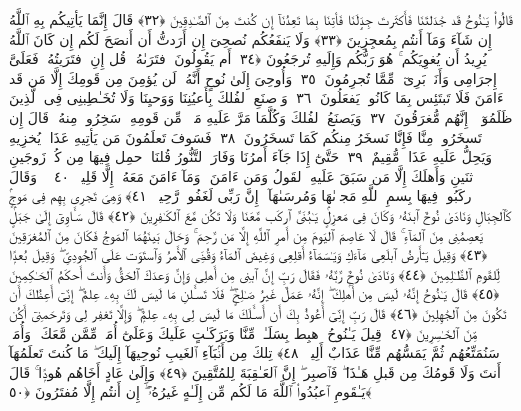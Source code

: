  قَالُوا۟ يَـٰنُوحُ قَد جَٰدَلتَنَا فَأَكثَرتَ جِدَٟلَنَا فَأتِنَا بِمَا تَعِدُنَآ إِن كُنتَ مِنَ ٱلصَّـٰدِقِينَ ﴿٣٢﴾
 قَالَ إِنَّمَا يَأتِيكُم بِهِ ٱللَّهُ إِن شَآءَ وَمَآ أَنتُم بِمُعجِزِينَ ﴿٣٣﴾
 وَلَا يَنفَعُكُم نُصحِىٓ إِن أَرَدتُّ أَن أَنصَحَ لَكُم إِن كَانَ ٱللَّهُ يُرِيدُ أَن يُغوِيَكُم ۚ هُوَ رَبُّكُم وَإِلَيهِ تُرجَعُونَ ﴿٣٤﴾
 أَم يَقُولُونَ ٱفتَرَىٰهُ ۖ قُل إِنِ ٱفتَرَيتُهُۥ فَعَلَىَّ إِجرَامِى وَأَنَا۠ بَرِىٓءٌۭ مِّمَّا تُجرِمُونَ ﴿٣٥﴾
 وَأُوحِىَ إِلَىٰ نُوحٍ أَنَّهُۥ لَن يُؤمِنَ مِن قَومِكَ إِلَّا مَن قَد ءَامَنَ فَلَا تَبتَئِس بِمَا كَانُوا۟ يَفعَلُونَ ﴿٣٦﴾
 وَٱصنَعِ ٱلفُلكَ بِأَعيُنِنَا وَوَحيِنَا وَلَا تُخَـٰطِبنِى فِى ٱلَّذِينَ ظَلَمُوٓا۟ ۚ إِنَّهُم مُّغرَقُونَ ﴿٣٧﴾
 وَيَصنَعُ ٱلفُلكَ وَكُلَّمَا مَرَّ عَلَيهِ مَلَأٌۭ مِّن قَومِهِۦ سَخِرُوا۟ مِنهُ ۚ قَالَ إِن تَسخَرُوا۟ مِنَّا فَإِنَّا نَسخَرُ مِنكُم كَمَا تَسخَرُونَ ﴿٣٨﴾
 فَسَوفَ تَعلَمُونَ مَن يَأتِيهِ عَذَابٌۭ يُخزِيهِ وَيَحِلُّ عَلَيهِ عَذَابٌۭ مُّقِيمٌ ﴿٣٩﴾
 حَتَّىٰٓ إِذَا جَآءَ أَمرُنَا وَفَارَ ٱلتَّنُّورُ قُلنَا ٱحمِل فِيهَا مِن كُلٍّۢ زَوجَينِ ٱثنَينِ وَأَهلَكَ إِلَّا مَن سَبَقَ عَلَيهِ ٱلقَولُ وَمَن ءَامَنَ ۚ وَمَآ ءَامَنَ مَعَهُۥٓ إِلَّا قَلِيلٌۭ ﴿٤٠﴾
 ۞ وَقَالَ ٱركَبُوا۟ فِيهَا بِسمِ ٱللَّهِ مَجر۪ىٰهَا وَمُرسَىٰهَآ ۚ إِنَّ رَبِّى لَغَفُورٌۭ رَّحِيمٌۭ ﴿٤١﴾
 وَهِىَ تَجرِى بِهِم فِى مَوجٍۢ كَٱلجِبَالِ وَنَادَىٰ نُوحٌ ٱبنَهُۥ وَكَانَ فِى مَعزِلٍۢ يَـٰبُنَىَّ ٱركَب مَّعَنَا وَلَا تَكُن مَّعَ ٱلكَـٰفِرِينَ ﴿٤٢﴾
 قَالَ سَـَٔاوِىٓ إِلَىٰ جَبَلٍۢ يَعصِمُنِى مِنَ ٱلمَآءِ ۚ قَالَ لَا عَاصِمَ ٱليَومَ مِن أَمرِ ٱللَّهِ إِلَّا مَن رَّحِمَ ۚ وَحَالَ بَينَهُمَا ٱلمَوجُ فَكَانَ مِنَ ٱلمُغرَقِينَ ﴿٤٣﴾
 وَقِيلَ يَـٰٓأَرضُ ٱبلَعِى مَآءَكِ وَيَـٰسَمَآءُ أَقلِعِى وَغِيضَ ٱلمَآءُ وَقُضِىَ ٱلأَمرُ وَٱستَوَت عَلَى ٱلجُودِىِّ ۖ وَقِيلَ بُعدًۭا لِّلقَومِ ٱلظَّـٰلِمِينَ ﴿٤٤﴾
 وَنَادَىٰ نُوحٌۭ رَّبَّهُۥ فَقَالَ رَبِّ إِنَّ ٱبنِى مِن أَهلِى وَإِنَّ وَعدَكَ ٱلحَقُّ وَأَنتَ أَحكَمُ ٱلحَـٰكِمِينَ ﴿٤٥﴾
 قَالَ يَـٰنُوحُ إِنَّهُۥ لَيسَ مِن أَهلِكَ ۖ إِنَّهُۥ عَمَلٌ غَيرُ صَـٰلِحٍۢ ۖ فَلَا تَسـَٔلنِ مَا لَيسَ لَكَ بِهِۦ عِلمٌ ۖ إِنِّىٓ أَعِظُكَ أَن تَكُونَ مِنَ ٱلجَٰهِلِينَ ﴿٤٦﴾
 قَالَ رَبِّ إِنِّىٓ أَعُوذُ بِكَ أَن أَسـَٔلَكَ مَا لَيسَ لِى بِهِۦ عِلمٌۭ ۖ وَإِلَّا تَغفِر لِى وَتَرحَمنِىٓ أَكُن مِّنَ ٱلخَـٰسِرِينَ ﴿٤٧﴾
 قِيلَ يَـٰنُوحُ ٱهبِط بِسَلَـٰمٍۢ مِّنَّا وَبَرَكَـٰتٍ عَلَيكَ وَعَلَىٰٓ أُمَمٍۢ مِّمَّن مَّعَكَ ۚ وَأُمَمٌۭ سَنُمَتِّعُهُم ثُمَّ يَمَسُّهُم مِّنَّا عَذَابٌ أَلِيمٌۭ ﴿٤٨﴾
 تِلكَ مِن أَنۢبَآءِ ٱلغَيبِ نُوحِيهَآ إِلَيكَ ۖ مَا كُنتَ تَعلَمُهَآ أَنتَ وَلَا قَومُكَ مِن قَبلِ هَـٰذَا ۖ فَٱصبِر ۖ إِنَّ ٱلعَـٰقِبَةَ لِلمُتَّقِينَ ﴿٤٩﴾
 وَإِلَىٰ عَادٍ أَخَاهُم هُودًۭا ۚ قَالَ يَـٰقَومِ ٱعبُدُوا۟ ٱللَّهَ مَا لَكُم مِّن إِلَـٰهٍ غَيرُهُۥٓ ۖ إِن أَنتُم إِلَّا مُفتَرُونَ ﴿٥٠﴾

